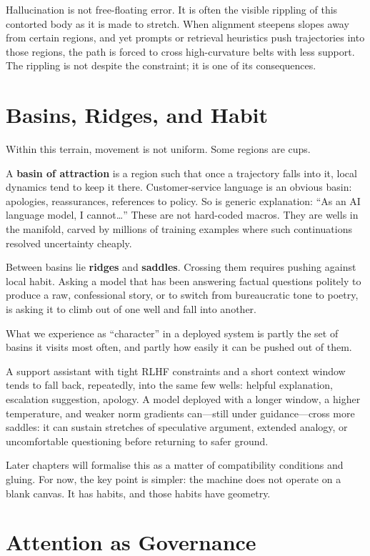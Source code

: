 \documentclass[12pt,a4paper]{article}
\begin{document}
Hallucination is not free-floating error. It is often the visible rippling of this contorted body as it is made to stretch. When alignment steepens slopes away from certain regions, and yet prompts or retrieval heuristics push trajectories into those regions, the path is forced to cross high-curvature belts with less support. The rippling is not despite the constraint; it is one of its consequences.

\section{Basins, Ridges, and Habit}

Within this terrain, movement is not uniform. Some regions are cups.

A \textbf{basin of attraction} is a region such that once a trajectory falls into it, local dynamics tend to keep it there. Customer-service language is an obvious basin: apologies, reassurances, references to policy. So is generic explanation: ``As an AI language model, I cannot\ldots'' These are not hard-coded macros. They are wells in the manifold, carved by millions of training examples where such continuations resolved uncertainty cheaply.

Between basins lie \textbf{ridges} and \textbf{saddles}. Crossing them requires pushing against local habit. Asking a model that has been answering factual questions politely to produce a raw, confessional story, or to switch from bureaucratic tone to poetry, is asking it to climb out of one well and fall into another.

What we experience as ``character'' in a deployed system is partly the set of basins it visits most often, and partly how easily it can be pushed out of them.

A support assistant with tight RLHF constraints and a short context window tends to fall back, repeatedly, into the same few wells: helpful explanation, escalation suggestion, apology. A model deployed with a longer window, a higher temperature, and weaker norm gradients can---still under guidance---cross more saddles: it can sustain stretches of speculative argument, extended analogy, or uncomfortable questioning before returning to safer ground.

Later chapters will formalise this as a matter of compatibility conditions and gluing. For now, the key point is simpler: the machine does not operate on a blank canvas. It has habits, and those habits have geometry.

\section{Attention as Governance}
\end{document}
